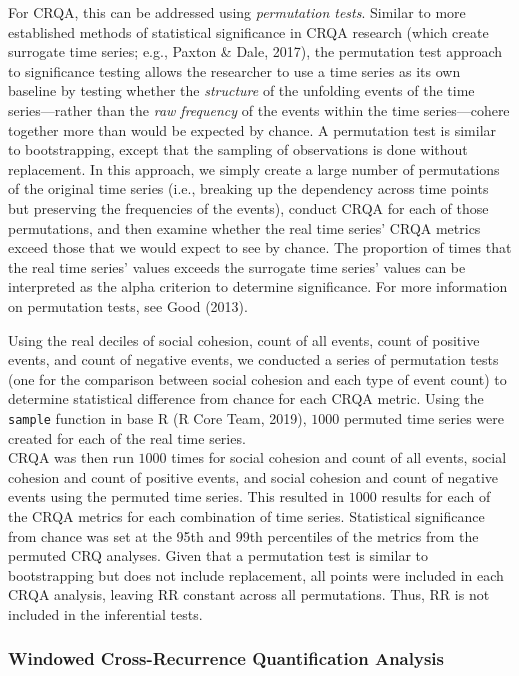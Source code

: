 \documentclass[english,man]{apa6}
\begin{document}
For CRQA, this can be addressed using \emph{permutation tests}.
Similar to more established methods of statistical significance in CRQA research
(which create surrogate time series; e.g., Paxton \& Dale, 2017),
the permutation test approach to significance testing allows the researcher
to use a time series as its own baseline by testing whether the \emph{structure}
of the unfolding events of the time series---rather than the \emph{raw frequency} of the
events within the time series---cohere together more than would be expected
by chance. A permutation test is similar to
bootstrapping, except that the sampling of observations is done without
replacement. In this approach, we simply create a large number of permutations
of the original time series (i.e., breaking up the dependency across time points but
preserving the frequencies of the events), conduct CRQA for each of those
permutations, and then examine whether the real time series' CRQA metrics
exceed those that we would expect to see by chance. The proportion of times that
the real time series' values exceeds the surrogate time series' values can
be interpreted as the alpha criterion to determine significance.
For more information on permutation
tests, see Good (2013).

Using the real deciles of social cohesion, count of all events,
count of positive events, and count of negative events, we conducted a series
of permutation tests
(one for the comparison between social cohesion and each type of event count)
to determine statistical difference from chance for each CRQA metric.
Using the \texttt{sample} function in base R (R Core Team, 2019), \(1000\) permuted time series were
created for each of the real time series.\\
CRQA was then run \(1000\) times for social cohesion and count of all
events, social cohesion and count of positive events, and social cohesion and
count of negative events using the permuted time series. This resulted in
\(1000\) results for each of the CRQA metrics for each combination of time series.
Statistical significance from chance was set at the 95th and 99th percentiles
of the metrics from the permuted CRQ analyses. Given that a permutation test
is similar to bootstrapping but does not include replacement, all points were
included in each CRQA analysis, leaving RR constant across all permutations. Thus,
RR is not included in the inferential tests.

\hypertarget{windowed-cross-recurrence-quantification-analysis}{%
\subsubsection{Windowed Cross-Recurrence Quantification Analysis}\label{windowed-cross-recurrence-quantification-analysis}}
\end{document}
